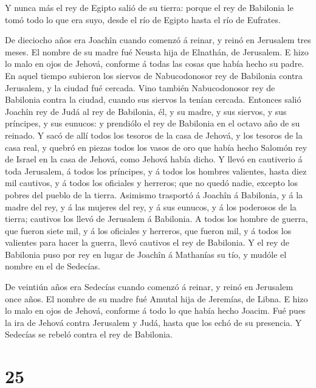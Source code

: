  Y nunca más el rey de Egipto salió de su tierra: porque el
rey de Babilonia le tomó todo lo que era suyo, desde el río de Egipto
hasta el río de Eufrates.

 De dieciocho años era Joachîn cuando comenzó á reinar, y
reinó en Jerusalem tres meses. El nombre de su madre fué Neusta hija de
Elnathán, de Jerusalem.  E hizo lo malo en ojos de Jehová,
conforme á todas las cosas que había hecho su padre.  En
aquel tiempo subieron los siervos de Nabucodonosor rey de Babilonia
contra Jerusalem, y la ciudad fué cercada.  Vino también
Nabucodonosor rey de Babilonia contra la ciudad, cuando sus siervos la
tenían cercada.  Entonces salió Joachîn rey de Judá al rey
de Babilonia, él, y su madre, y sus siervos, y sus príncipes, y sus
eunucos: y prendiólo el rey de Babilonia en el octavo año de su reinado.
 Y sacó de allí todos los tesoros de la casa de Jehová, y
los tesoros de la casa real, y quebró en piezas todos los vasos de oro
que había hecho Salomón rey de Israel en la casa de Jehová, como Jehová
había dicho.  Y llevó en cautiverio á toda Jerusalem, á
todos los príncipes, y á todos los hombres valientes, hasta diez mil
cautivos, y á todos los oficiales y herreros; que no quedó nadie,
excepto los pobres del pueblo de la tierra.  Asimismo
trasportó á Joachîn á Babilonia, y á la madre del rey, y á las mujeres
del rey, y á sus eunucos, y á los poderosos de la tierra; cautivos los
llevó de Jerusalem á Babilonia.  A todos los hombre de
guerra, que fueron siete mil, y á los oficiales y herreros, que fueron
mil, y á todos los valientes para hacer la guerra, llevó cautivos el rey
de Babilonia.  Y el rey de Babilonia puso por rey en lugar
de Joachîn á Mathanías su tío, y mudóle el nombre en el de Sedecías.

 De veintiún años era Sedecías cuando comenzó á reinar, y
reinó en Jerusalem once años. El nombre de su madre fué Amutal hija de
Jeremías, de Libna.  E hizo lo malo en ojos de Jehová,
conforme á todo lo que había hecho Joacim.  Fué pues la ira
de Jehová contra Jerusalem y Judá, hasta que los echó de su presencia. Y
Sedecías se rebeló contra el rey de Babilonia.

\hypertarget{section-24}{%
\section{25}\label{section-24}}

